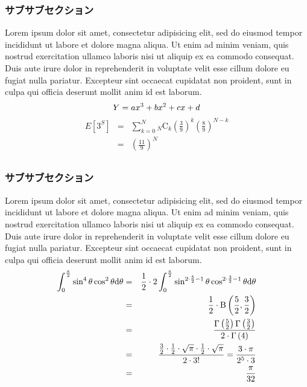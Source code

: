 \documentclass[a4j,10.5pt]{jarticle}
\begin{document}
\subsubsection{サブサブセクション}
Lorem ipsum dolor sit amet, consectetur adipisicing elit, sed do eiusmod tempor incididunt ut labore et dolore magna aliqua. Ut enim ad minim veniam, quis nostrud exercitation ullamco laboris nisi ut aliquip ex ea commodo consequat. Duis aute irure dolor in reprehenderit in voluptate velit esse cillum dolore eu fugiat nulla pariatur. Excepteur sint occaecat cupidatat non proident, sunt in culpa qui officia deserunt mollit anim id est laborum.
\begin{equation}
Y=ax^3+bx^2+cx+d \\
\end{equation}
\begin{eqnarray}
E[3^S] & = & \sum ^{N} _{k=0}{} _{N}\mathrm{C}_{k} \left( \frac{3}{9} \right)^{k} \left( \frac{8}{9} \right)^{N-k} \\
       & = & \left( \frac{11}{9}\right)^N \\
\end{eqnarray}
\subsubsection{サブサブセクション}
Lorem ipsum dolor sit amet, consectetur adipisicing elit, sed do eiusmod tempor incididunt ut labore et dolore magna aliqua. Ut enim ad minim veniam, quis nostrud exercitation ullamco laboris nisi ut aliquip ex ea commodo consequat. Duis aute irure dolor in reprehenderit in voluptate velit esse cillum dolore eu fugiat nulla pariatur. Excepteur sint occaecat cupidatat non proident, sunt in culpa qui officia deserunt mollit anim id est laborum.
\begin{eqnarray}
\int^\frac{\pi}{2} _0 \sin^4\theta \cos^2 \theta {\rm d} \theta &=& \frac{1}{2} \cdot 2 \int^\frac{\pi}{2} _0 \sin^{2 \cdot \frac{5}{2} -1}\theta \cos^{2 \cdot \frac{3}{2}-1} \theta {\rm d}\theta\\
&=& \frac{1}{2} \cdot \rm B \left( \frac{5}{2} , \frac{3}{2} \right)\nonumber \\
&=& \frac{\Gamma \left(\frac{5}{2} \right)\Gamma \left(\frac{3}{2} \right)}{2\cdot\Gamma \left( 4 \right)}\\
&=& \frac{\frac{3}{2} \cdot \frac{1}{2} \cdot \sqrt{\pi} \cdot \frac{1}{2} \cdot \sqrt{\pi}}{2 \cdot 3! }  =  \frac{3 \cdot \pi}{2^5 \cdot 3}\nonumber \\
&=& \frac{\pi}{32}
\end{eqnarray}
\end{document}
